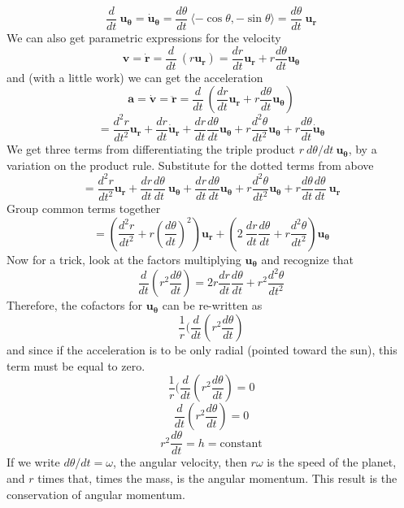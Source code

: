 \documentclass[11pt, oneside]{article}   	%
\begin{document}
\[ \frac{d}{dt} \ \mathbf{u_{\theta}} = \dot{\mathbf{u}}_\mathbf{\theta} =  \frac{d\theta}{dt} \ \langle -\cos \theta, -\sin \theta \rangle =  \frac{d\theta}{dt} \ \mathbf{u_r} \]
We can also get parametric expressions for the velocity
\[ \mathbf{v} = \dot{\mathbf{r}} = \frac{d}{dt} \ (r \mathbf{u_r}) = \frac{dr}{dt} \mathbf{u_r} + r \frac{d \theta}{dt}  \mathbf{u_{\theta}} \]
 and (with a little work) we can get the acceleration
 \[ \mathbf{a} = \dot{\mathbf{v}} = \ddot{\mathbf{r}} = \frac{d}{dt} \ (\frac{dr}{dt} \mathbf{u_r} + r \frac{d \theta}{dt}  \mathbf{u_{\theta}}) \]
 \[ = \frac{d^2r}{dt^2} \mathbf{u_r} + \frac{dr}{dt} \dot{\mathbf{u}}_\mathbf{r} + \frac{dr}{dt} \frac{d \theta}{dt}  \mathbf{u_{\theta}} + r \frac{d^2\theta}{dt^2} \mathbf{u_{\theta}} + r \frac{d\theta}{dt} \dot{\mathbf{u}}_\mathbf{\theta}  \]
 We get three terms from differentiating the triple product $r \ d\theta/dt  \ \mathbf{u_{\theta}}$, by a variation on the product rule.  Substitute for the dotted terms from above
\[ = \frac{d^2r}{dt^2} \mathbf{u_r} + \frac{dr}{dt} \frac{d\theta}{dt} \ \mathbf{u_{\theta}} + \frac{dr}{dt} \frac{d \theta}{dt}  \mathbf{u_{\theta}} + r \frac{d^2\theta}{dt^2} \mathbf{u_{\theta}} + r \frac{d\theta}{dt} \frac{d\theta}{dt} \ \mathbf{u_r}  \]
Group common terms together
\[ = (\frac{d^2r}{dt^2} + r (\frac{d\theta}{dt})^2 ) \mathbf{u_r}  + (2 \ \frac{dr}{dt} \frac{d\theta}{dt} + r \frac{d^2\theta}{dt^2}) \mathbf{u_{\theta}}  \]
Now for a trick, look at the factors multiplying $\mathbf{u_{\theta}}$ and recognize that
\[ \frac{d}{dt} ( r^2 \frac{d\theta}{dt}) = 2 r \frac{dr}{dt} \frac{d\theta}{dt} + r^2 \frac{d^2\theta}{dt^2}\]
Therefore, the cofactors for $\mathbf{u_{\theta}}$ can be re-written as
\[ \frac{1}{r} (\frac{d}{dt} ( r^2 \frac{d\theta}{dt}) \]
and since if the acceleration is to be only radial (pointed toward the sun), this term must be equal to zero.
\[ \frac{1}{r} (\frac{d}{dt} ( r^2 \frac{d\theta}{dt}) = 0 \]
\[ \frac{d}{dt} ( r^2 \frac{d\theta}{dt}) = 0 \]
\[ r^2 \frac{d\theta}{dt} = h = \text{constant} \]
If we write $d\theta/dt = \omega$, the angular velocity, then $r \omega$ is the speed of the planet, and $r$ times that, times the mass, is the angular momentum.  This result is the conservation of angular momentum.
\end{document}
